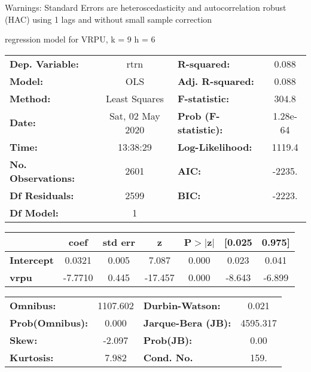 Warnings: \newline
 [1] Standard Errors are heteroscedasticity and autocorrelation robust (HAC) using 1 lags and without small sample correction\ 

regression model for VRPU, k = 9 h = 6\begin{center}
\begin{tabular}{lclc}
\toprule
\textbf{Dep. Variable:}    &       rtrn       & \textbf{  R-squared:         } &     0.088   \\
\textbf{Model:}            &       OLS        & \textbf{  Adj. R-squared:    } &     0.088   \\
\textbf{Method:}           &  Least Squares   & \textbf{  F-statistic:       } &     304.8   \\
\textbf{Date:}             & Sat, 02 May 2020 & \textbf{  Prob (F-statistic):} &  1.28e-64   \\
\textbf{Time:}             &     13:38:29     & \textbf{  Log-Likelihood:    } &    1119.4   \\
\textbf{No. Observations:} &        2601      & \textbf{  AIC:               } &    -2235.   \\
\textbf{Df Residuals:}     &        2599      & \textbf{  BIC:               } &    -2223.   \\
\textbf{Df Model:}         &           1      & \textbf{                     } &             \\
\bottomrule
\end{tabular}
\begin{tabular}{lcccccc}
                   & \textbf{coef} & \textbf{std err} & \textbf{z} & \textbf{P$> |$z$|$} & \textbf{[0.025} & \textbf{0.975]}  \\
\midrule
\textbf{Intercept} &       0.0321  &        0.005     &     7.087  &         0.000        &        0.023    &        0.041     \\
\textbf{vrpu}      &      -7.7710  &        0.445     &   -17.457  &         0.000        &       -8.643    &       -6.899     \\
\bottomrule
\end{tabular}
\begin{tabular}{lclc}
\textbf{Omnibus:}       & 1107.602 & \textbf{  Durbin-Watson:     } &    0.021  \\
\textbf{Prob(Omnibus):} &   0.000  & \textbf{  Jarque-Bera (JB):  } & 4595.317  \\
\textbf{Skew:}          &  -2.097  & \textbf{  Prob(JB):          } &     0.00  \\
\textbf{Kurtosis:}      &   7.982  & \textbf{  Cond. No.          } &     159.  \\
\bottomrule
\end{tabular}
\end{center}

